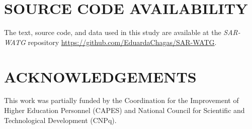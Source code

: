 \documentclass[journal]{IEEEtran}
\begin{document}



\section{SOURCE CODE AVAILABILITY} 

The text, source code, and data used in this study are available at the \textit{SAR-WATG} repository \url{https://github.com/EduardaChagas/SAR-WATG}.




\section*{ACKNOWLEDGEMENTS}\label{ACKNOWLEDGEMENTS}

This work was partially funded by the Coordination for the Improvement of Higher Education Personnel (CAPES) and National Council for Scientific and Technological Development (CNPq).
\end{document}
